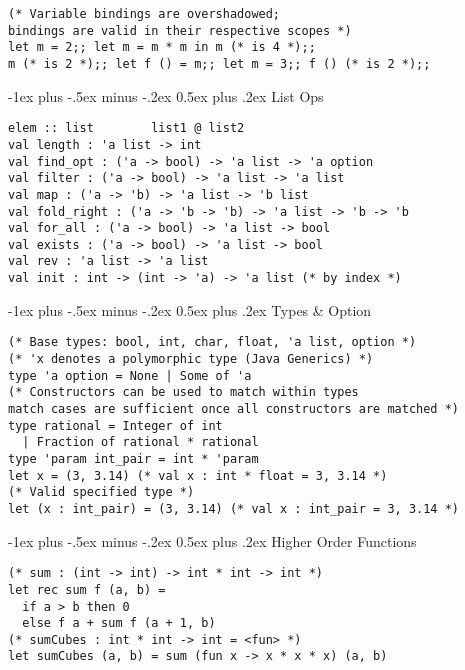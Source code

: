 \documentclass[12pt]{article}
\makeatletter
\renewcommand{\section}{\@startsection{section}{1}{0mm}%
                                    {-1ex plus -.5ex minus -.2ex}%
                                    {0.5ex plus .2ex}%
                                    {\normalfont\large\bfseries\color{header}}}
\makeatother
\begin{document}
\begin{multicols}{2}
\begin{lstlisting}
(* Variable bindings are overshadowed; 
bindings are valid in their respective scopes *)
let m = 2;; let m = m * m in m (* is 4 *);; 
m (* is 2 *);; let f () = m;; let m = 3;; f () (* is 2 *);;
    \end{lstlisting}
    
	\section{List Ops}
	\begin{lstlisting}
elem :: list        list1 @ list2
val length : 'a list -> int
val find_opt : ('a -> bool) -> 'a list -> 'a option
val filter : ('a -> bool) -> 'a list -> 'a list 
val map : ('a -> 'b) -> 'a list -> 'b list
val fold_right : ('a -> 'b -> 'b) -> 'a list -> 'b -> 'b
val for_all : ('a -> bool) -> 'a list -> bool
val exists : ('a -> bool) -> 'a list -> bool
val rev : 'a list -> 'a list
val init : int -> (int -> 'a) -> 'a list (* by index *)
    \end{lstlisting}
    
    \columnbreak
    \section{Types \& Option}
    \begin{lstlisting}
(* Base types: bool, int, char, float, 'a list, option *)
(* 'x denotes a polymorphic type (Java Generics) *)
type 'a option = None | Some of 'a
(* Constructors can be used to match within types
match cases are sufficient once all constructors are matched *)
type rational = Integer of int
  | Fraction of rational * rational
type 'param int_pair = int * 'param
let x = (3, 3.14) (* val x : int * float = 3, 3.14 *)
(* Valid specified type *)
let (x : int_pair) = (3, 3.14) (* val x : int_pair = 3, 3.14 *)
    \end{lstlisting}
	
	\section{Higher Order Functions}
	\begin{lstlisting}
(* sum : (int -> int) -> int * int -> int *)
let rec sum f (a, b) =
  if a > b then 0
  else f a + sum f (a + 1, b)
(* sumCubes : int * int -> int = <fun> *)
let sumCubes (a, b) = sum (fun x -> x * x * x) (a, b)
	\end{lstlisting}


\end{multicols}
\end{document}
